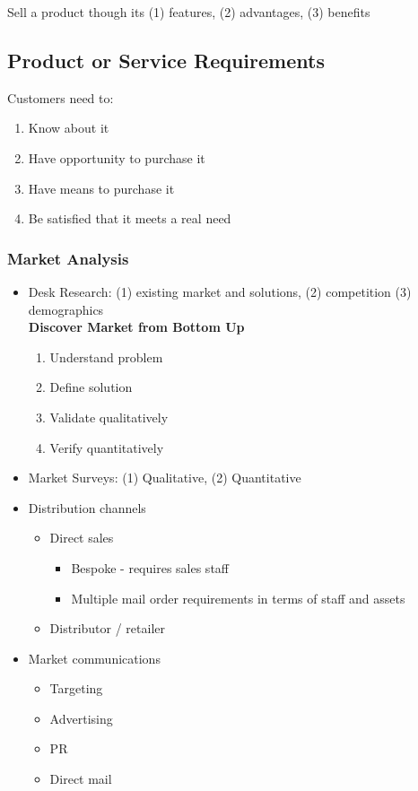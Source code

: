 \documentclass{article}
\begin{document}
\begin{multicols}{2}
Sell a product though its (1) features, (2) advantages, (3) benefits

\subsection{Product or Service Requirements}
Customers need to:
\begin{enumerate}
    \item Know about it
    \item Have opportunity to purchase it
    \item Have means to purchase it
    \item Be satisfied that it meets a real need
\end{enumerate}

\subsubsection{Market Analysis}
\begin{itemize}
    \item Desk Research: (1) existing market and solutions, (2) competition (3) demographics \\
    \textbf{Discover Market from Bottom Up}
    \begin{enumerate}
        \item Understand problem
        \item Define solution
        \item Validate qualitatively
        \item Verify quantitatively
    \end{enumerate}
    \item Market Surveys: (1) Qualitative, (2) Quantitative
    \item Distribution channels
    \begin{itemize}
        \item Direct sales
        \begin{itemize}
            \item Bespoke - requires sales staff
            \item Multiple mail order requirements in terms of staff and assets
        \end{itemize}
        \item Distributor / retailer
    \end{itemize}
    \item Market communications
    \begin{itemize}
        \item Targeting
        \item Advertising
        \item PR
        \item Direct mail
    \end{itemize}
\end{itemize}


\end{multicols}
\end{document}
